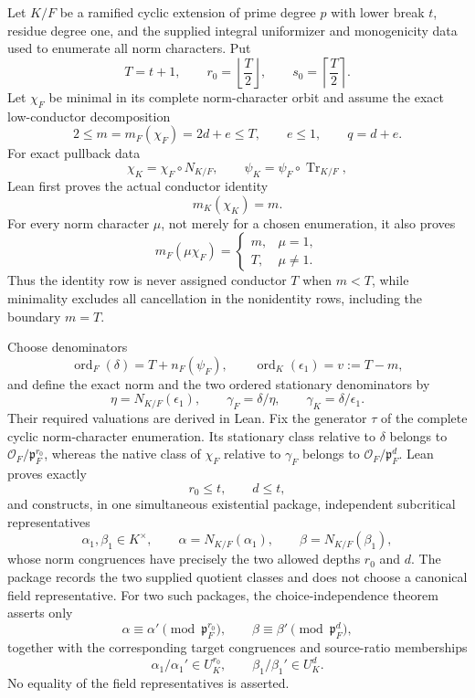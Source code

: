 \begin{theorem}
\label{mod:parameters-low}
Let $K/F$ be a ramified cyclic extension of prime degree $p$ with lower
break $t$, residue degree one, and the supplied integral uniformizer and
monogenicity data used to enumerate all norm characters.  Put
\[
 T=t+1,
 \qquad r_0=\left\lfloor\frac T2\right\rfloor,
 \qquad s_0=\left\lceil\frac T2\right\rceil .
\]
Let $\chi_F$ be minimal in its complete norm-character orbit and assume
the exact low-conductor decomposition
\[
 2\leq m=m_F(\chi_F)=2d+e\leq T,
 \qquad e\leq1,
 \qquad q=d+e.
\]
For exact pullback data
\[
 \chi_K=\chi_F\circ N_{K/F},
 \qquad
 \psi_K=\psi_F\circ\operatorname{Tr}_{K/F},
\]
Lean first proves the actual conductor identity
\[
 m_K(\chi_K)=m.
\]
For every norm character $\mu$, not merely for a chosen enumeration, it
also proves
\[
 m_F(\mu\chi_F)=
 \begin{cases}
 m,&\mu=1,\\
 T,&\mu\ne1.
 \end{cases}
\]
Thus the identity row is never assigned conductor $T$ when $m<T$, while
minimality excludes all cancellation in the nonidentity rows, including
the boundary $m=T$.

Choose denominators
\[
 \operatorname{ord}_F(\delta)=T+n_F(\psi_F),
 \qquad
 \operatorname{ord}_K(\epsilon_1)=v:=T-m,
\]
and define the exact norm and the two ordered stationary denominators by
\[
 \eta=N_{K/F}(\epsilon_1),
 \qquad
 \gamma_F=\delta/\eta,
 \qquad
 \gamma_K=\delta/\epsilon_1.
\]
Their required valuations are derived in Lean.  Fix the generator $\tau$
of the complete cyclic norm-character enumeration.  Its stationary class
relative to $\delta$ belongs to
$\mathcal O_F/\mathfrak p_F^{r_0}$, whereas the native class of $\chi_F$
relative to $\gamma_F$ belongs to
$\mathcal O_F/\mathfrak p_F^d$.  Lean proves exactly
\[
 r_0\leq t,
 \qquad d\leq t,
\]
and constructs, in one simultaneous existential package, independent
subcritical representatives
\[
 \alpha_1,\beta_1\in K^\times,
 \qquad
 \alpha=N_{K/F}(\alpha_1),
 \qquad
 \beta=N_{K/F}(\beta_1),
\]
whose norm congruences have precisely the two allowed depths $r_0$ and
$d$.  The package records the two supplied quotient classes and does not
choose a canonical field representative.  For two such packages, the
choice-independence theorem asserts only
\[
 \alpha\equiv\alpha'\pmod{\mathfrak p_F^{r_0}},
 \qquad
 \beta\equiv\beta'\pmod{\mathfrak p_F^d},
\]
together with the corresponding target congruences and source-ratio
memberships
\[
 \alpha_1/\alpha_1'\in U_K^{r_0},
 \qquad
 \beta_1/\beta_1'\in U_K^d.
\]
No equality of the field representatives is asserted.


\end{theorem}
